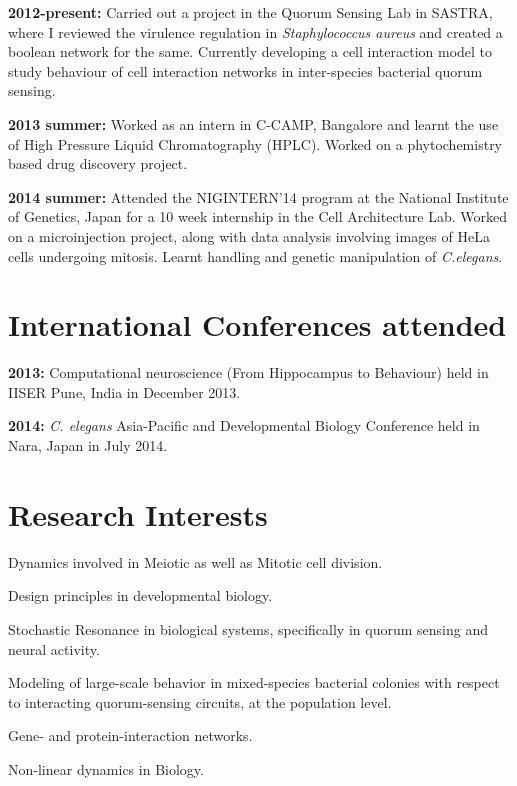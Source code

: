 \documentclass{res}
\begin{document}
\begin{resume}
{\bf 2012-present:} Carried out a project in the Quorum Sensing Lab in SASTRA, where I reviewed the virulence regulation in {\it Staphylococcus aureus} and created a boolean network for the same. Currently developing a cell interaction model to study behaviour of cell interaction networks in inter-species bacterial quorum sensing.

{\bf 2013 summer:} Worked as an intern in C-CAMP, Bangalore and learnt the use of High Pressure Liquid Chromatography (HPLC). Worked on a phytochemistry based drug discovery project.

{\bf 2014 summer:} Attended the NIGINTERN'14 program at the National Institute of Genetics, Japan for a 10 week internship in the Cell Architecture Lab. Worked on a microinjection project, along with data analysis involving images of HeLa cells undergoing mitosis. Learnt handling and genetic manipulation of {\it C.elegans}. 

\section{International Conferences attended}
\vspace{0.1in}

{\bf 2013:} Computational neuroscience (From Hippocampus to Behaviour) held in IISER Pune, India in December 2013.

{\bf 2014:} {\it C. elegans} Asia-Pacific and Developmental Biology Conference held in Nara, Japan in July 2014.   

\pagebreak
\section{Research Interests}
\vspace{0.1in}

Dynamics involved in Meiotic as well as Mitotic cell division.

Design principles in developmental biology.

Stochastic Resonance in biological systems, specifically in quorum sensing and neural activity.

Modeling of large-scale behavior in mixed-species bacterial colonies with respect to interacting quorum-sensing circuits, at the population level.

Gene- and protein-interaction networks.

Non-linear dynamics in Biology.


\end{resume}
\end{document}

